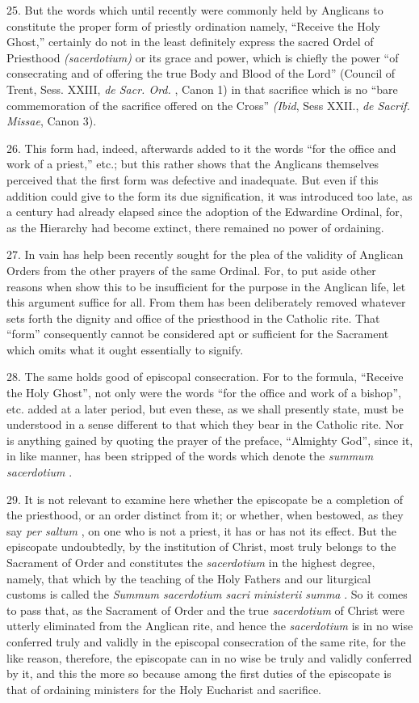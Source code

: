 25. But the words which until recently were commonly held by Anglicans
to constitute the proper form of priestly ordination namely, ``Receive
the Holy Ghost,'' certainly do not in the least definitely express the
sacred Ordel of Priesthood \emph{(sacerdotium)} or its grace and power,
which is chiefly the power ``of consecrating and of offering the true
Body and Blood of the Lord'' (Council of Trent, Sess. XXIII, \emph{de
Sacr. Ord.} , Canon 1) in that sacrifice which is no ``bare
commemoration of the sacrifice offered on the Cross'' \emph{(Ibid}, Sess
XXII., \emph{de Sacrif. Missae}, Canon 3).

26. This form had, indeed, afterwards added to it the words ``for the
office and work of a priest,'' etc.; but this rather shows that the
Anglicans themselves perceived that the first form was defective and
inadequate. But even if this addition could give to the form its due
signification, it was introduced too late, as a century had already
elapsed since the adoption of the Edwardine Ordinal, for, as the
Hierarchy had become extinct, there remained no power of ordaining.

27. In vain has help been recently sought for the plea of the validity
of Anglican Orders from the other prayers of the same Ordinal. For, to
put aside other reasons when show this to be insufficient for the
purpose in the Anglican life, let this argument suffice for all. From
them has been deliberately removed whatever sets forth the dignity and
office of the priesthood in the Catholic rite. That ``form''
consequently cannot be considered apt or sufficient for the Sacrament
which omits what it ought essentially to signify.

28. The same holds good of episcopal consecration. For to the formula,
``Receive the Holy Ghost'', not only were the words ``for the office and
work of a bishop'', etc. added at a later period, but even these, as we
shall presently state, must be understood in a sense different to that
which they bear in the Catholic rite. Nor is anything gained by quoting
the prayer of the preface, ``Almighty God'', since it, in like manner,
has been stripped of the words which denote the \emph{summum
sacerdotium} .

29. It is not relevant to examine here whether the episcopate be a
completion of the priesthood, or an order distinct from it; or whether,
when bestowed, as they say \emph{per saltum} , on one who is not a
priest, it has or has not its effect. But the episcopate undoubtedly, by
the institution of Christ, most truly belongs to the Sacrament of Order
and constitutes the \emph{sacerdotium} in the highest degree, namely,
that which by the teaching of the Holy Fathers and our liturgical
customs is called the \emph{Summum sacerdotium sacri ministerii summa} .
So it comes to pass that, as the Sacrament of Order and the true
\emph{sacerdotium} of Christ were utterly eliminated from the Anglican
rite, and hence the \emph{sacerdotium} is in no wise conferred truly and
validly in the episcopal consecration of the same rite, for the like
reason, therefore, the episcopate can in no wise be truly and validly
conferred by it, and this the more so because among the first duties of
the episcopate is that of ordaining ministers for the Holy Eucharist and
sacrifice.

